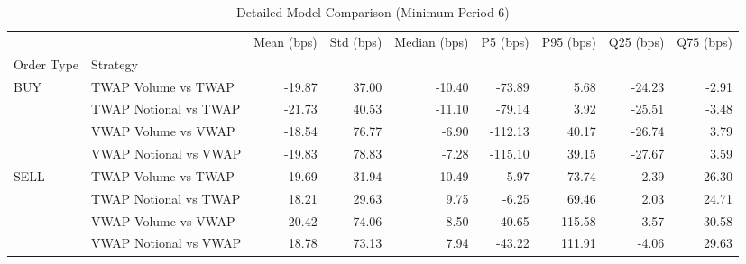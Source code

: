 \begin{table}
\caption{Detailed Model Comparison (Minimum Period 6)}
\label{tab:detailed_min_period_6}
\begin{tabular}{l|l|rrrrrrr}
\toprule
 &  & Mean (bps) & Std (bps) & Median (bps) & P5 (bps) & P95 (bps) & Q25 (bps) & Q75 (bps) \\
Order Type & Strategy &  &  &  &  &  &  &  \\
\midrule
\multirow[t]{4}{*}{BUY} & TWAP Volume vs TWAP & -19.87 & 37.00 & -10.40 & -73.89 & 5.68 & -24.23 & -2.91 \\
 & TWAP Notional vs TWAP & -21.73 & 40.53 & -11.10 & -79.14 & 3.92 & -25.51 & -3.48 \\
 & VWAP Volume vs VWAP & -18.54 & 76.77 & -6.90 & -112.13 & 40.17 & -26.74 & 3.79 \\
 & VWAP Notional vs VWAP & -19.83 & 78.83 & -7.28 & -115.10 & 39.15 & -27.67 & 3.59 \\
\cline{1-9}
\multirow[t]{4}{*}{SELL} & TWAP Volume vs TWAP & 19.69 & 31.94 & 10.49 & -5.97 & 73.74 & 2.39 & 26.30 \\
 & TWAP Notional vs TWAP & 18.21 & 29.63 & 9.75 & -6.25 & 69.46 & 2.03 & 24.71 \\
 & VWAP Volume vs VWAP & 20.42 & 74.06 & 8.50 & -40.65 & 115.58 & -3.57 & 30.58 \\
 & VWAP Notional vs VWAP & 18.78 & 73.13 & 7.94 & -43.22 & 111.91 & -4.06 & 29.63 \\
\cline{1-9}
\bottomrule
\end{tabular}
\end{table}
